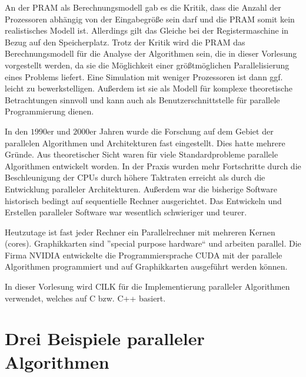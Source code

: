 An der PRAM als Berechnungsmodell gab es die Kritik, dass die Anzahl der Prozessoren abhängig von der Eingabegröße sein darf und die PRAM somit kein realistisches Modell ist. Allerdings gilt das Gleiche bei der Registermaschine in Bezug auf den Speicherplatz. Trotz der Kritik wird die PRAM das Berechnungsmodell für die Analyse der Algorithmen sein, die in dieser Vorlesung vorgestellt werden, da sie die Möglichkeit einer größtmöglichen Parallelisierung eines Problems liefert. Eine Simulation mit weniger Prozessoren ist dann ggf. leicht zu bewerkstelligen. Außerdem ist sie als Modell für komplexe theoretische Betrachtungen sinnvoll und kann auch als Benutzerschnittstelle für parallele Programmierung dienen.

In den $1990\text{er}$ und $2000\text{er}$ Jahren wurde die Forschung auf dem Gebiet der parallelen Algorithmen und Architekturen fast eingestellt. Dies hatte mehrere Gründe. Aus theoretischer Sicht waren für viele Standardprobleme parallele Algorithmen entwickelt worden. In der Praxis wurden mehr Fortschritte durch die Beschleunigung der CPUs durch höhere Taktraten erreicht als durch die Entwicklung paralleler Architekturen. Außerdem war die bisherige Software historisch bedingt auf sequentielle Rechner ausgerichtet. Das Entwickeln und Erstellen paralleler Software war wesentlich schwieriger und teurer.

Heutzutage ist fast jeder Rechner ein Parallelrechner mit mehreren Kernen (cores). Graphikkarten sind ''special purpose hardware`` und arbeiten parallel. Die Firma NVIDIA entwickelte die Programmiersprache CUDA mit der parallele Algorithmen programmiert und auf Graphikkarten ausgeführt werden können.

In dieser Vorlesung wird CILK für die Implementierung paralleler Algorithmen verwendet, welches auf C bzw. C++ basiert. 

\section{Drei Beispiele paralleler Algorithmen}
